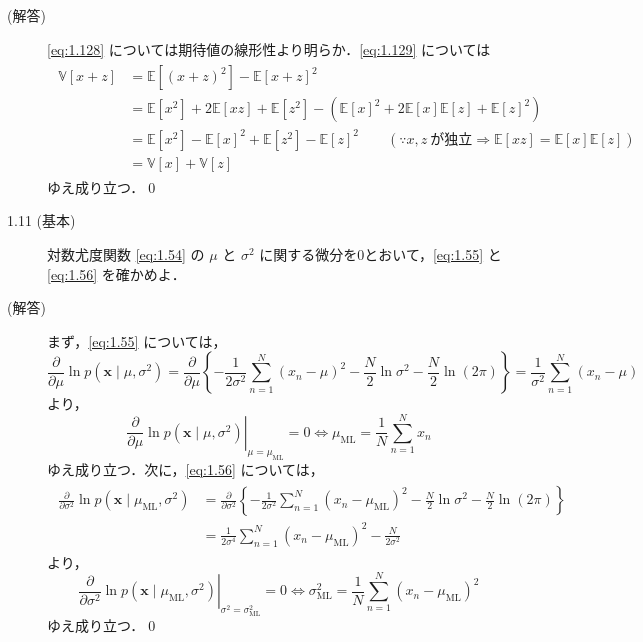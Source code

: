 \documentclass[uplatex,a4paper,oneside,openany,dvipdfmx]{jsarticle}
\numberwithin{equation}{section}
\theoremstyle{mystyle} %
\newcommand{\BE}{\mathbb{E}}
\newcommand{\BV}{\mathbb{V}}
\newcommand{\mb}[1]{\mathbf{#1}}
\begin{document}
\begin{description}
\item[(解答)] \eqref{eq:1.128} については期待値の線形性より明らか．\eqref{eq:1.129} については
\begin{align}
    \begin{aligned}
        \BV[x+z] &= \BE[(x+z)^{2}] - \BE[x+z]^{2} \\
        &= \BE[x^{2}] + 2\BE[xz] + \BE[z^{2}] - (\BE[x]^{2} + 2\BE[x]\BE[z] + \BE[z]^{2}) \\
        &= \BE[x^{2}] - \BE[x]^{2} + \BE[z^{2}] - \BE[z]^{2} \qquad (\because x,z\ \text{が独立} \Rightarrow \BE[xz] = \BE[x]\BE[z]) \\
        &= \BV[x] + \BV[z]
    \end{aligned}
\end{align}
ゆえ成り立つ．\qed

\item[1.11 (基本)] 対数尤度関数 \eqref{eq:1.54} の $\mu$ と $\sigma^{2}$ に関する微分を0とおいて，\eqref{eq:1.55} と \eqref{eq:1.56} を確かめよ．

\item[(解答)] まず，\eqref{eq:1.55} については，
\begin{equation}
    \frac{\partial}{\partial{\mu}} \ln p(\mb{x} \mid \mu,\sigma^{2}) = \frac{\partial}{\partial{\mu}} \left\{-\frac{1}{2\sigma^{2}} \sum_{n=1}^{N} (x_{n}-\mu)^{2} - \frac{N}{2} \ln \sigma^{2} - \frac{N}{2} \ln (2\pi)\right\} = \frac{1}{\sigma^{2}} \sum_{n=1}^{N} (x_{n}-\mu)
\end{equation}
より，
\begin{equation}
    \left.\frac{\partial}{\partial{\mu}} \ln p(\mb{x} \mid \mu,\sigma^{2})\right|_{\mu=\mu_{\text{ML}}} = 0 \iff \mu_{\text{ML}} = \frac{1}{N} \sum_{n=1}^{N} x_{n}
\end{equation}
ゆえ成り立つ．次に，\eqref{eq:1.56} については，
\begin{align}
    \begin{aligned}
        \frac{\partial}{\partial{\sigma^{2}}} \ln p(\mb{x} \mid \mu_{\text{ML}},\sigma^{2}) &= \frac{\partial}{\partial{\sigma^{2}}} \left\{-\frac{1}{2\sigma^{2}} \sum_{n=1}^{N} (x_{n}-\mu_{\text{ML}})^{2} - \frac{N}{2} \ln \sigma^{2} - \frac{N}{2} \ln (2\pi)\right\} \\
        &= \frac{1}{2\sigma^{4}} \sum_{n=1}^{N} (x_{n}-\mu_{\text{ML}})^{2} - \frac{N}{2\sigma^{2}}
    \end{aligned}
\end{align}
より，
\begin{equation}
    \left.\frac{\partial}{\partial{\sigma^{2}}} \ln p(\mb{x} \mid \mu_{\text{ML}},\sigma^{2})\right|_{\sigma^{2}=\sigma_{\text{ML}}^{2}} = 0 \iff \sigma_{\text{ML}}^{2} = \frac{1}{N} \sum_{n=1}^{N} (x_{n}-\mu_{\text{ML}})^{2}
\end{equation}
ゆえ成り立つ．\qed


\end{description}
\end{document}
